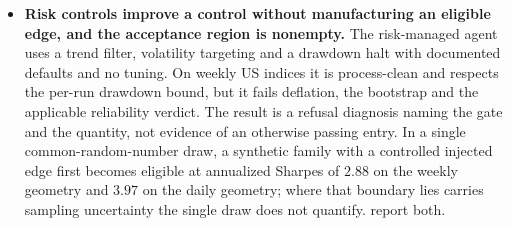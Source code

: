 \begin{itemize}[leftmargin=*,itemsep=2pt]
\item \textbf{Risk controls improve a control without manufacturing an eligible edge, and the acceptance region is nonempty.} The risk-managed agent uses a trend filter, volatility targeting and a drawdown halt with documented defaults and no tuning. On weekly US indices it is process-clean and respects the per-run drawdown bound, but it fails deflation, the bootstrap and the applicable reliability verdict. The result is a refusal diagnosis naming the gate and the quantity, not evidence of an otherwise passing entry. In a single common-random-number draw, a synthetic family with a controlled injected edge first becomes eligible at annualized Sharpes of $2.88$ on the weekly geometry and $3.97$ on the daily geometry; where that boundary lies carries sampling uncertainty the single draw does not quantify.  report both.
\end{itemize}

